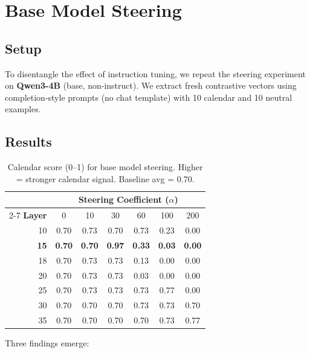 \documentclass[11pt,a4paper]{article}
\begin{document}
\section{Base Model Steering}
\label{sec:base_steering}

\subsection{Setup}

To disentangle the effect of instruction tuning, we repeat the steering experiment on \textbf{Qwen3-4B} (base, non-instruct). We extract fresh contrastive vectors using completion-style prompts (no chat template) with 10 calendar and 10 neutral examples.

\subsection{Results}

\begin{table}[H]
\centering
\caption{Calendar score (0--1) for base model steering. Higher = stronger calendar signal. Baseline avg = 0.70.}
\label{tab:base_steering}
\small
\begin{tabular}{rcccccc}
\toprule
& \multicolumn{6}{c}{\textbf{Steering Coefficient ($\alpha$)}} \\
\cmidrule(lr){2-7}
\textbf{Layer} & 0 & 10 & 30 & 60 & 100 & 200 \\
\midrule
10 & 0.70 & 0.73 & 0.70 & 0.73 & 0.23 & 0.00 \\
\textbf{15} & \textbf{0.70} & \textbf{0.70} & \textbf{0.97} & \textbf{0.33} & \textbf{0.03} & \textbf{0.00} \\
18 & 0.70 & 0.73 & 0.73 & 0.13 & 0.00 & 0.00 \\
20 & 0.70 & 0.73 & 0.73 & 0.03 & 0.00 & 0.00 \\
25 & 0.70 & 0.73 & 0.73 & 0.73 & 0.77 & 0.00 \\
30 & 0.70 & 0.70 & 0.70 & 0.73 & 0.73 & 0.70 \\
35 & 0.70 & 0.70 & 0.70 & 0.70 & 0.73 & 0.77 \\
\bottomrule
\end{tabular}
\end{table}

Three findings emerge:
\end{document}
